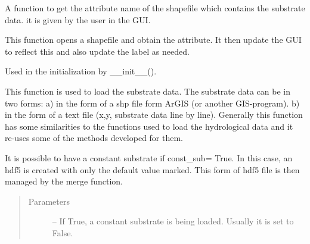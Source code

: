 \documentclass[letterpaper,10pt,english]{sphinxmanual}
\begin{document}
\begin{fulllineitems}
\begin{fulllineitems}
\end{fulllineitems}


\begin{fulllineitems}
\label{\detokenize{index:src_GUI.hydro_GUI_2.SubstrateW.get_att_name}}
A function to get the attribute name of the shapefile which contains the substrate data. it is given by the user
in the GUI.

\end{fulllineitems}


\begin{fulllineitems}
\label{\detokenize{index:src_GUI.hydro_GUI_2.SubstrateW.get_attribute_from_shp}}
This function opens a shapefile and obtain the attribute. It then update the GUI
to reflect this and also update the label as needed.

\end{fulllineitems}


\begin{fulllineitems}
\label{\detokenize{index:src_GUI.hydro_GUI_2.SubstrateW.init_iu}}
Used in the initialization by \_\_init\_\_().

\end{fulllineitems}


\begin{fulllineitems}
\label{\detokenize{index:src_GUI.hydro_GUI_2.SubstrateW.load_sub_gui}}
This function is used to load the substrate data. The substrate data can be in two forms: a) in the form of a shp
file form ArGIS (or another GIS-program). b) in the form of a text file (x,y, substrate data line by line).
Generally this function has some similarities to the functions used to load the hydrological data and it re-uses
some of the methods developed for them.

It is possible to have a constant substrate if const\_sub= True. In this
case, an hdf5 is created with only the default value marked. This form of hdf5 file is then managed by the merge
function.
\begin{quote}\begin{description}
\item[{Parameters}] \leavevmode
{} -- If True, a constant substrate is being loaded. Usually it is set to False.


\end{description}
\end{quote}
\end{fulllineitems}
\end{fulllineitems}
\end{document}
